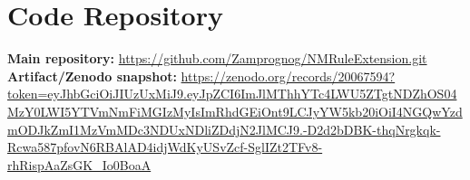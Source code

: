 \documentclass[runningheads]{llncs}
\newcommand{\suppurl}[2]{\noindent\textbf{#1:} \url{#2}\\}
\begin{document}


    
    
    

\section{Code Repository}
\suppurl{Main repository}{https://github.com/Zamprognog/NMRuleExtension.git}
\suppurl{Artifact/Zenodo snapshot}{https://zenodo.org/records/20067594?token=eyJhbGciOiJIUzUxMiJ9.eyJpZCI6ImJlMThhYTc4LWU5ZTgtNDZhOS04MzY0LWI5YTVmNmFiMGIzMyIsImRhdGEiOnt9LCJyYW5kb20iOiI4NGQwYzdmODJkZmI1MzVmMDc3NDUxNDliZDdjN2JlMCJ9.-D2d2bDBK-thqNrgkqk-Rcwa587pfovN6RBAlAD4idjWdKyUSvZcf-SglIZt2TFv8-rhRispAaZsGK_Io0BoaA}
\end{document}

